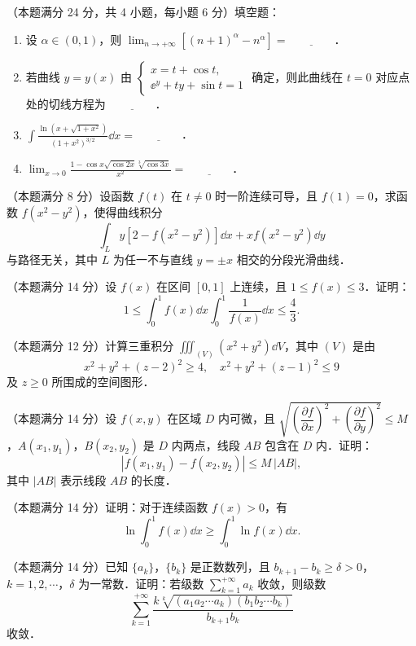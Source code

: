
\begin{problems}
\item[一、]（本题满分 24 分，共 4 小题，每小题 6 分）填空题：
\begin{enumerate}
  \item 设 $\alpha\in(0,1)$，则 $\displaystyle\lim_{n\to+\infty}\left[(n+1)^{\alpha}-n^{\alpha}\right]=\underline{\qquad\qquad}$．
  \item 若曲线 $y=y(x)$ 由 $\begin{cases}x=t+\cos t,\\ \ee^{y}+ty+\sin t=1\end{cases}$ 确定，则此曲线在 $t=0$ 对应点处的切线方程为 $\underline{\qquad\qquad}$．
  \item $\displaystyle\int\frac{\ln\left(x+\sqrt{1+x^{2}}\right)}{\left(1+x^{2}\right)^{3/2}}\dd x=\underline{\qquad\qquad}$．
  \item $\displaystyle\lim_{x\to 0}\frac{1-\cos x\sqrt{\cos 2x}\sqrt[3]{\cos 3x}}{x^{2}}=\underline{\qquad\qquad}$．
\end{enumerate}

\item[二、]（本题满分 8 分）设函数 $f(t)$ 在 $t\ne 0$ 时一阶连续可导，且 $f(1)=0$，求函数 $f\left(x^{2}-y^{2}\right)$，使得曲线积分
\[
\int_{L}y\left[2-f\left(x^{2}-y^{2}\right)\right]\dd x+xf\left(x^{2}-y^{2}\right)\dd y
\]
与路径无关，其中 $L$ 为任一不与直线 $y=\pm x$ 相交的分段光滑曲线．

\item[三、]（本题满分 14 分）设 $f(x)$ 在区间 $[0,1]$ 上连续，且 $1\le f(x)\le 3$．证明：
\[
1\le\int_{0}^{1}f(x)\dd x\int_{0}^{1}\frac{1}{f(x)}\dd x\le\frac{4}{3}.
\]

\item[四、]（本题满分 12 分）计算三重积分 $\displaystyle\iiint_{(V)}\left(x^{2}+y^{2}\right)\dd V$，其中 $(V)$ 是由
\[
x^{2}+y^{2}+(z-2)^{2}\ge 4,\quad x^{2}+y^{2}+(z-1)^{2}\le 9
\]
及 $z\ge 0$ 所围成的空间图形．

\item[五、]（本题满分 14 分）设 $f(x,y)$ 在区域 $D$ 内可微，且 $\sqrt{\left(\dfrac{\partial f}{\partial x}\right)^{2}+\left(\dfrac{\partial f}{\partial y}\right)^{2}}\le M$，$A(x_{1},y_{1})$，$B(x_{2},y_{2})$ 是 $D$ 内两点，线段 $AB$ 包含在 $D$ 内．证明：
\[
\left|f(x_{1},y_{1})-f(x_{2},y_{2})\right|\le M\,|AB|,
\]
其中 $|AB|$ 表示线段 $AB$ 的长度．

\item[六、]（本题满分 14 分）证明：对于连续函数 $f(x)>0$，有
\[
\ln\int_{0}^{1}f(x)\dd x\ge\int_{0}^{1}\ln f(x)\dd x.
\]

\item[七、]（本题满分 14 分）已知 $\{a_{k}\}$，$\{b_{k}\}$ 是正数数列，且 $b_{k+1}-b_{k}\ge\delta>0$，$k=1,2,\cdots$，$\delta$ 为一常数．证明：若级数 $\displaystyle\sum_{k=1}^{+\infty}a_{k}$ 收敛，则级数
\[
\sum_{k=1}^{+\infty}\frac{k\sqrt[k]{\left(a_{1}a_{2}\cdots a_{k}\right)\left(b_{1}b_{2}\cdots b_{k}\right)}}{b_{k+1}b_{k}}
\]
收敛．
\end{problems}
